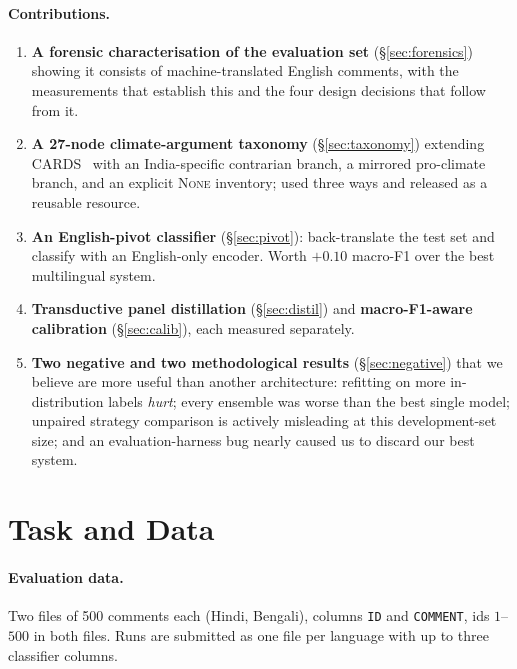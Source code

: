 \documentclass[twocolumn]{ceurart}
\begin{document}
\paragraph{Contributions.}
\begin{enumerate}
  \item \textbf{A forensic characterisation of the evaluation set}
    (\S\ref{sec:forensics}) showing it consists of machine-translated English
    comments, with the measurements that establish this and the four design
    decisions that follow from it.
  \item \textbf{A 27-node climate-argument taxonomy}
    (\S\ref{sec:taxonomy}) extending CARDS~\cite{coan2021} with an
    India-specific contrarian branch, a mirrored pro-climate branch, and an
    explicit \textsc{None} inventory; used three ways and released as a
    reusable resource.
  \item \textbf{An English-pivot classifier} (\S\ref{sec:pivot}): back-translate
    the test set and classify with an English-only encoder. Worth $+0.10$
    macro-F1 over the best multilingual system.
  \item \textbf{Transductive panel distillation} (\S\ref{sec:distil}) and
    \textbf{macro-F1-aware calibration} (\S\ref{sec:calib}), each measured
    separately.
  \item \textbf{Two negative and two methodological results}
    (\S\ref{sec:negative}) that we believe are more useful than another
    architecture: refitting on more in-distribution labels \emph{hurt};
    every ensemble was worse than the best single model; unpaired strategy
    comparison is actively misleading at this development-set size; and an
    evaluation-harness bug nearly caused us to discard our best system.
\end{enumerate}

\section{Task and Data}
\label{sec:data}

\paragraph{Evaluation data.}
Two files of 500 comments each (Hindi, Bengali), columns \texttt{ID} and
\texttt{COMMENT}, ids $1$--$500$ in both files. Runs are submitted as one file
per language with up to three classifier columns.
\end{document}
